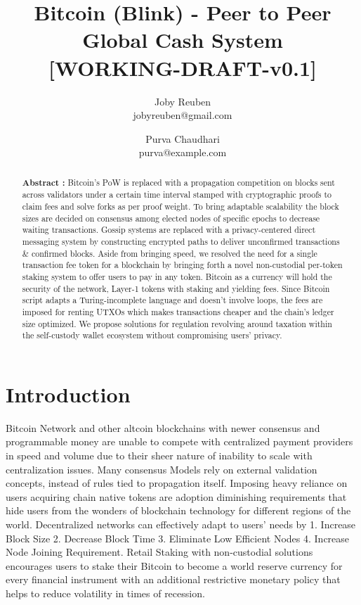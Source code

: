 \documentclass[a4paper,10pt]{article}
\title{
 \large \textbf{Bitcoin (Blink) - Peer to Peer Global Cash System}\\
\vspace{6mm}
\scriptsize [WORKING-DRAFT-v0.1]
}
\author{ \myfontt Joby Reuben \\ \myfontt jobyreuben@gmail.com \and  \myfontt Purva Chaudhari \\ \myfontt purva@example.com}
\date{}
\begin{document}
\maketitle

\begin{abstract}
\noindent \textbf{Abstract :} Bitcoin's PoW is replaced with a propagation competition on blocks sent across validators under a certain time interval stamped with cryptographic proofs to claim fees and solve forks as per proof weight. To bring adaptable scalability the block sizes are decided on consensus among elected nodes of specific epochs to decrease waiting transactions. Gossip systems are replaced with a privacy-centered direct messaging system by constructing encrypted paths to deliver unconfirmed transactions \& confirmed blocks. Aside from bringing speed, we resolved the need for a single transaction fee token for a blockchain by bringing forth a novel non-custodial per-token staking system to offer users to pay in any token. Bitcoin as a currency will hold the security of the network, Layer-1 tokens with staking and yielding fees. Since Bitcoin script adapts a Turing-incomplete language and doesn't involve loops, the fees are imposed for renting UTXOs which makes transactions cheaper and the chain's ledger size optimized. We propose solutions for regulation revolving around taxation within the self-custody wallet ecosystem without compromising users' privacy. 

\end{abstract}

\section{Introduction}
Bitcoin Network and other altcoin blockchains with newer consensus and programmable money are unable to compete with centralized payment providers in speed and volume due to their sheer nature of inability to scale with centralization issues. Many consensus Models rely on external validation concepts, instead of rules tied to propagation itself. Imposing heavy reliance on users acquiring chain native tokens are adoption diminishing requirements that hide users from the wonders of blockchain technology for different regions of the world. Decentralized networks can effectively adapt to users' needs by 1. Increase Block Size 2. Decrease Block Time 3. Eliminate Low Efficient Nodes 4. Increase Node Joining Requirement. Retail Staking with non-custodial solutions encourages users to stake their Bitcoin to become a world reserve currency for every financial instrument with an additional restrictive monetary policy that helps to reduce volatility in times of recession.
\end{document}
